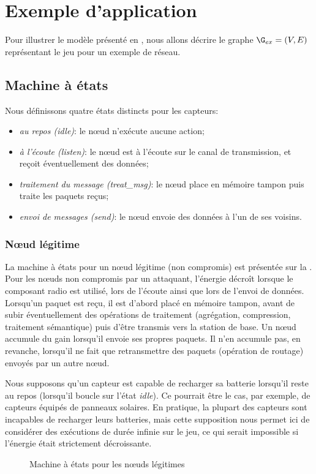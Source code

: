 \section{Exemple d'application}
\label{tj:sec:example}
Pour illustrer le modèle présenté en , nous allons décrire le graphe $\G_{ex} = (V,E)$ représentant le jeu pour un exemple de réseau.

    \subsection{Machine à états}

Nous définissons quatre états distincts pour les capteurs:
\begin{itemize}
    \item \emph{au repos (idle)}: le nœud n'exécute aucune action;
    \item \emph{à l'écoute (listen)}: le nœud est à l'écoute sur le canal de transmission, et reçoit éventuellement des données;
    \item \emph{traitement du message (treat\_msg)}: le nœud place en mémoire tampon puis traite les paquets reçus;
    \item \emph{envoi de messages (send)}: le nœud envoie des données à l'un de ses voisins.
\end{itemize}

        \subsubsection{Nœud légitime}
La machine à états pour un nœud légitime (non compromis) est présentée sur la .
Pour les nœuds non compromis par un attaquant, l'énergie décroît lorsque le composant radio est utilisé, \cad lors de l'écoute ainsi que lors de l'envoi de données.
Lorsqu'un paquet est reçu, il est d'abord placé en mémoire tampon, avant de subir éventuellement des opérations de traitement (agrégation, compression, traitement sémantique) puis d'être transmis vers la station de base.
Un nœud accumule du gain lorsqu'il envoie ses propres paquets.
Il n'en accumule pas, en revanche, lorsqu'il ne fait que retransmettre des paquets (opération de routage) envoyés par un autre nœud.

Nous supposons qu'un capteur est capable de recharger sa batterie lorsqu'il reste au repos (\cad lorsqu'il boucle sur l'état \emph{idle}).
Ce pourrait être le cas, par exemple, de capteurs équipés de panneaux solaires.
En pratique, la plupart des capteurs sont incapables de recharger leurs batteries, mais cette supposition nous permet ici de considérer des exécutions de durée infinie sur le jeu, ce qui serait impossible si l'énergie était strictement décroissante.
\begin{figure}[H]
    \centering
    
    \caption{Machine à états pour les nœuds légitimes}\label{tj:fig:autGoodNode}
\end{figure}

